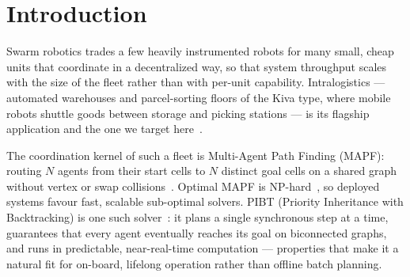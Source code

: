 
\section{Introduction}
\label{sec:introduction}
Swarm robotics trades a few heavily instrumented robots for many small, cheap units
that coordinate in a decentralized way, so that system throughput scales with the size
of the fleet rather than with per-unit capability. Intralogistics --- automated
warehouses and parcel-sorting floors of the Kiva type, where mobile robots shuttle
goods between storage and picking stations --- is its flagship application and the one
we target here~\cite{TODO:swarm_survey}\cite{TODO:warehouse}.%

The coordination kernel of such a fleet is Multi-Agent Path Finding (MAPF): routing
$N$ agents from their start cells to $N$ distinct goal cells on a shared graph without
vertex or swap collisions~\cite{TODO:MAPF}.%
Optimal MAPF is NP-hard~\cite{okumura22priority}, so deployed systems favour fast,
scalable sub-optimal solvers. PIBT (Priority Inheritance with Backtracking) is one
such solver~\cite{okumura22priority}: it plans a single synchronous step at a time,
guarantees that every agent eventually reaches its goal on biconnected graphs, and runs
in predictable, near-real-time computation --- properties that make it a natural fit
for on-board, lifelong operation rather than offline batch planning.

